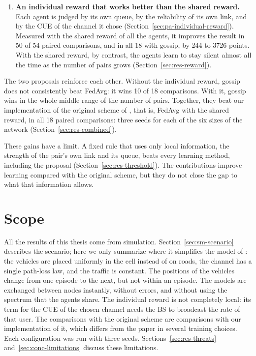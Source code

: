 \begin{enumerate}
  \item \textbf{An individual reward that works better than the shared reward.} Each agent is judged by its
    own queue, by the reliability of its own link, and by the \ac{CUE} of the channel it chose
    (Section~\ref{sec:pa-individual-reward}). Measured with the shared reward of all the agents, it improves
    the result in 50 of 54 paired comparisons, and in all 18 with gossip, by 244 to 3726 points. With the
    shared reward, by contrast, the agents learn to stay silent almost all the time as the number of pairs
    grows (Section~\ref{sec:res-reward}).
\end{enumerate}

The two proposals reinforce each other. Without the individual reward, gossip does not consistently beat
\ac{FedAvg}: it wins 10 of 18 comparisons. With it, gossip wins in the whole middle range of the number of
pairs. Together, they beat our implementation of the original scheme of \citet{li+22fedmarl}, that is,
\ac{FedAvg} with the shared reward, in all 18 paired comparisons: three seeds for each of the six sizes of
the network (Section~\ref{sec:res-combined}).

These gains have a limit. A fixed rule that uses only local information, the strength of the pair's own link
and its queue, beats every learning method, including the proposal (Section~\ref{sec:res-threshold}). The
contributions improve learning compared with the original scheme, but they do not close the gap to what that
information allows.

\section{Scope}
\label{sec:intro-scope}

All the results of this thesis come from simulation. Section~\ref{sec:sm-scenario} describes the scenario;
here we only summarize where it simplifies the model of \citet{li+22fedmarl}: the vehicles are placed
uniformly in the cell instead of on roads, the channel has a single path-loss law, and the traffic is
constant. The positions of the vehicles change from one episode to the next, but not within an episode. The
models are exchanged between nodes instantly, without errors, and without using the spectrum that the
agents share. The individual reward is not completely local: its term for the \ac{CUE} of the chosen channel
needs the \ac{BS} to broadcast the rate of that user. The comparisons with the original scheme are
comparisons with our implementation of it, which differs from the paper in several training choices. Each
configuration was run with three seeds. Sections~\ref{sec:res-threats} and~\ref{sec:conc-limitations}
discuss these limitations.

